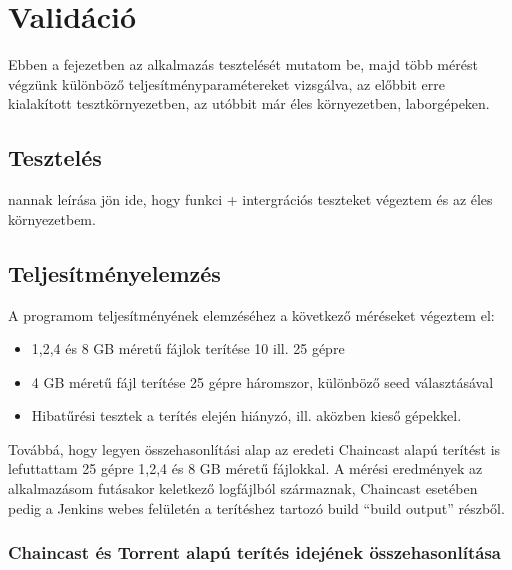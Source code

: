 \chapter{Validáció}
\label{chp:validation}

Ebben a fejezetben az alkalmazás tesztelését mutatom be, majd több mérést végzünk különböző teljesítményparamétereket vizsgálva, az előbbit erre kialakított tesztkörnyezetben, az utóbbit már éles környezetben, laborgépeken.

\section{Tesztelés}

nannak leírása jön ide, hogy funkci + intergrációs teszteket végeztem és az éles környezetbem.


\section{Teljesítményelemzés}
A programom teljesítményének elemzéséhez a következő méréseket végeztem el:

\begin{itemize}
  \item 1,2,4 és 8 GB méretű fájlok terítése 10 ill. 25 gépre
  \item 4 GB méretű fájl terítése 25 gépre háromszor, különböző seed választásával
  \item Hibatűrési tesztek a terítés elején hiányzó, ill. aközben kieső gépekkel.
\end{itemize}

Továbbá, hogy legyen összehasonlítási alap  az eredeti Chaincast alapú terítést is lefuttattam 25 gépre 1,2,4 és 8 GB méretű fájlokkal.
A mérési eredmények az alkalmazásom futásakor keletkező logfájlból származnak, Chaincast esetében pedig a Jenkins webes felületén a terítéshez tartozó build ``build output'' részből.

%
\subsection{Chaincast és Torrent alapú terítés idejének összehasonlítása}
%

